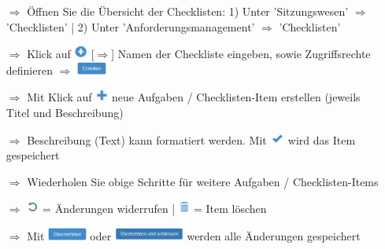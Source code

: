 \documentclass{article}
\begin{document}
\begin{multicols}{2}

\begin{tcolorbox}[colback=blue!5,colframe=blue!40!black,title=\textbf{Neue Checkliste erstellen}]
\begin{itemize}
  \item[$\Longrightarrow$] Öffnen Sie die Übersicht der Checklisten: 1) Unter 'Sitzungswesen' $\Rightarrow$ 'Checklisten' | 2) Unter 'Anforderungsmanagement' $\Longrightarrow$ 'Checklisten'
  \item[$\Longrightarrow$] Klick auf \includegraphics[height=12pt]{Icons/Plussymbol.jpg} [$\Rightarrow$] Namen der Checkliste eingeben, sowie Zugriffsrechte definieren $\Rightarrow$ \includegraphics[height=12pt]{Icons/B_Erstellen.jpg}
  \item[$\Longrightarrow$] Mit Klick auf \includegraphics[height=12pt]{Icons/Pluszeichen.jpg} neue Aufgaben / Checklisten-Item erstellen (jeweils Titel und Beschreibung)
	\item[$\Longrightarrow$] Beschreibung (Text) kann formatiert werden. Mit \includegraphics[height=12pt]{Icons/Gutzeichen.jpg} wird das Item gespeichert
  \item[$\Longrightarrow$] Wiederholen Sie obige Schritte für weitere Aufgaben / Checklisten-Items
  \item[$\Longrightarrow$] \includegraphics[height=12pt]{Icons/Refresh.jpg}	= Änderungen widerrufen | \includegraphics[height=12pt]{Icons/Muelltonne.jpg} = Item löschen
	\item[$\Longrightarrow$] Mit \includegraphics[height=12pt]{Icons/B_Uebernehmen.jpg} oder \includegraphics[height=12pt]{Icons/ueb_schliessen.png} werden alle Änderungen gespeichert
\end{itemize}
\end{tcolorbox}


\end{multicols}
\end{document}

